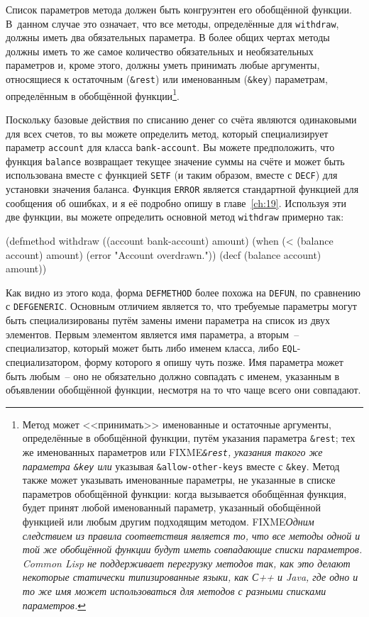 Список параметров метода должен быть конгруэнтен его обобщённой функции.  В~данном случае
это означает, что все методы, определённые для \lstinline{withdraw}, должны иметь два
обязательных параметра.  В более общих чертах методы должны иметь то же самое количество
обязательных и необязательных параметров и, кроме этого, должны уметь принимать любые
аргументы, относящиеся к остаточным (\lstinline!&rest!) или именованным (\lstinline!&key!)
параметрам, определённым в обобщённой функции\footnote{Метод может <<принимать>>
  именованные и остаточные аргументы, определённые в обобщённой функции, путём указания
  параметра \lstinline!&rest!; тех же именованных параметров или
  FIXME\textit{\lstinline!&rest!, указания такого же параметра \lstinline!&key! или}
  указывая \lstinline!&allow-other-keys! вместе с \lstinline!&key!.  Метод также может
  указывать именованные параметры, не указанные в списке параметров обобщённой функции:
  когда вызывается обобщённая функция, будет принят любой именованный параметр, указанный
  обобщённой функцией или любым другим подходящим методом.  FIXME\textit{Одним следствием
    из правила соответствия является то, что все методы одной и той же обобщённой функции
    будут иметь совпадающие списки параметров.  Common Lisp не поддерживает перегрузку
    методов так, как это делают некоторые статически типизированные языки, как С++ и Java,
    где одно и то же имя может использоваться для методов с разными списками параметров.}
}.

Поскольку базовые действия по списанию денег со счёта являются одинаковыми для всех
счетов, то вы можете определить метод, который специализирует параметр \lstinline{account} для
класса \lstinline{bank-account}.  Вы можете предположить, что функция \lstinline{balance} возвращает
текущее значение суммы на счёте и может быть использована вместе с функцией \lstinline{SETF} (и
таким образом, вместе с \lstinline{DECF}) для установки значения баланса.  Функция \lstinline{ERROR}
является стандартной функцией для сообщения об ошибках, и я её подробно опишу в
главе~\ref{ch:19}.  Используя эти две функции, вы можете определить основной метод
\lstinline{withdraw} примерно так:

\begin{myverb}
  (defmethod withdraw ((account bank-account) amount)
    (when (< (balance account) amount)
      (error "Account overdrawn."))
    (decf (balance account) amount))
\end{myverb}

Как видно из этого кода, форма \lstinline{DEFMETHOD} более похожа на \lstinline{DEFUN}, по сравнению
с \lstinline{DEFGENERIC}.  Основным отличием является то, что требуемые параметры могут быть
специализированы путём замены имени параметра на список из двух элементов.  Первым
элементом является имя параметра, а вторым~-- специализатор, который может быть либо
именем класса, либо \lstinline{EQL}-специализатором, форму которого я опишу чуть позже.  Имя
параметра может быть любым~-- оно не обязательно должно совпадать с именем, указанным в
объявлении обобщённой функции, несмотря на то что чаще всего они совпадают.

